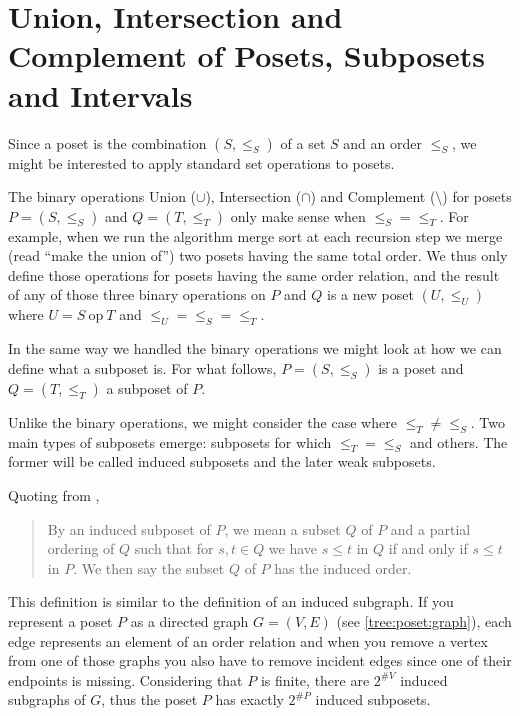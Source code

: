 \section{Union, Intersection and Complement of Posets, Subposets and Intervals}
\label{tree:poset:sub}


Since a poset is the combination $(S, \le_S)$ of a set $S$ and an order
$\le_S$, we might be interested to apply standard set operations to posets.

The binary operations Union ($\cup$), Intersection ($\cap$) and Complement
($\setminus$) for posets $P = (S, \le_S)$ and $Q = (T, \le_T)$ only make sense
when $\le_S = \le_T$. For example, when we run the algorithm merge sort at each
recursion step we merge (read ``make the union of'') two posets having the same
total order. We thus only define those operations for posets having the same
order relation, and the result of any of those three binary operations on $P$
and $Q$ is a new poset $(U, \le_U)$ where $U = S~\text{op}~T$ and $\le_U =
\le_S = \le_T$.


In the same way we handled the binary operations we might look at how we can
define what a subposet is. For what follows, $P = (S, \le_S)$ is a poset and $Q
= (T, \le_T)$ a subposet of $P$.

Unlike the binary operations, we might consider the case where $\le_T \neq
\le_S$. Two main types of subposets emerge: subposets for which $\le_T = \le_S$
and others. The former will be called induced subposets and the later weak
subposets.

Quoting from \cite{Stanley:2011:ECV:2124415},

\begin{quotation}

By an induced subposet of $P$, we mean a subset $Q$ of $P$ and a partial
ordering of $Q$ such that for $s, t \in Q$ we have $s \leq t$ in $Q$ if and
only if $s \leq t$ in $P$. We then say the subset $Q$ of $P$ has the induced
order.

\end{quotation}

This definition is similar to the definition of an induced subgraph. If you
represent a poset $P$ as a directed graph $G = (V, E)$ (see
\ref{tree:poset:graph}), each edge represents an element of an order relation
and when you remove a vertex from one of those graphs you also have to remove
incident edges since one of their endpoints is missing. Considering that $P$ is
finite, there are $2^{\#V}$ induced subgraphs of $G$, thus the poset $P$ has
exactly $2^{\#P}$ induced subposets.

